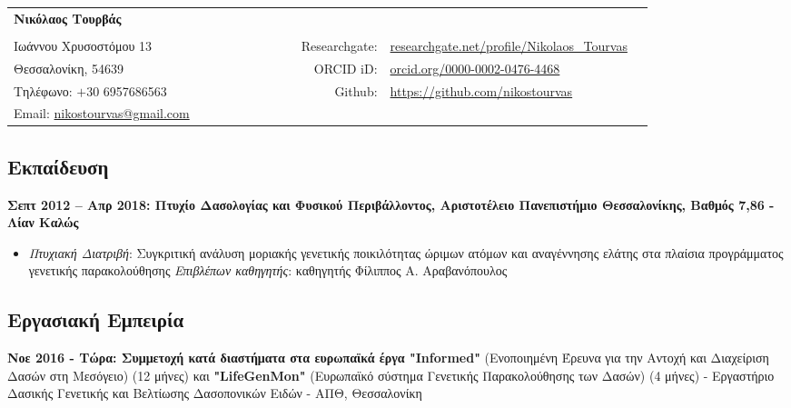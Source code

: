 \documentclass[12pt,]{scrartcl}
\date{}
\begin{document}
\begin{table}[h]
{\def\arraystretch{1.0}\tabcolsep=0pt
\begin{tabular}{p{0.42\linewidth}p{0.05\linewidth}p{0.35\linewidth}}

  \multirow{1}{*}{\LARGE \textbf{Νικόλαος Τουρβάς}} &  &  \\
  
  & & \\
  
  Ιωάννου Χρυσοστόμου 13 & \multicolumn{1}{r}{Researchgate:\;\;} & \multicolumn{1}{l}{\url{researchgate.net/profile/Nikolaos_Tourvas}} \\
  
  Θεσσαλονίκη, 54639 & \multicolumn{1}{r}{ORCID iD:\;\;} & \multicolumn{1}{l}{\href{https://orcid.org/0000-0002-0476-4468}{orcid.org/0000-0002-0476-4468}} \\
  
  Τηλέφωνο: $+$30 6957686563 & \multicolumn{1}{r}{Github:\;\;} & \multicolumn{1}{l}{\href{https://github.com/nikostourvas}{https://github.com/nikostourvas}} \\
  
  Email: {\href{nikostourvas@gmail.com}{nikostourvas@gmail.com}} 
\end{tabular}%
}
\end{table}


\subsection{Εκπαίδευση}\label{Εκπαίδευση}
\vspace{-3mm}
\textbf{Σεπτ 2012 -- Απρ 2018: Πτυχίο Δασολογίας και Φυσικού Περιβάλλοντος, Αριστοτέλειο Πανεπιστήμιο Θεσσαλονίκης, Βαθμός 7,86 - Λίαν Καλώς}
\begin{itemize}
\setlength\itemsep{-0.5em}
\item \textit{Πτυχιακή Διατριβή}: Συγκριτική ανάλυση μοριακής γενετικής ποικιλότητας
ώριμων ατόμων και αναγέννησης ελάτης στα πλαίσια
προγράμματος γενετικής παρακολούθησης
\vspace{2mm}
\newline
\textit{Επιβλέπων καθηγητής}: καθηγητής Φίλιππος Α. Αραβανόπουλος
\end{itemize}

\vspace{-3mm}

\subsection{Εργασιακή Εμπειρία}\label{Εμπειρία}
\vspace{-3mm}
\textbf{Νοε 2016 - Τώρα: Συμμετοχή κατά διαστήματα στα ευρωπαϊκά έργα "Informed"} (Ενοποιημένη Έρευνα για την Αντοχή και Διαχείριση Δασών στη Μεσόγειο) (12 μήνες) και \textbf{"LifeGenMon"} (Ευρωπαϊκό σύστημα Γενετικής Παρακολούθησης των Δασών) (4 μήνες) - Εργαστήριο Δασικής Γενετικής και Βελτίωσης Δασοπονικών Ειδών - ΑΠΘ, Θεσσαλονίκη 
\end{document}
